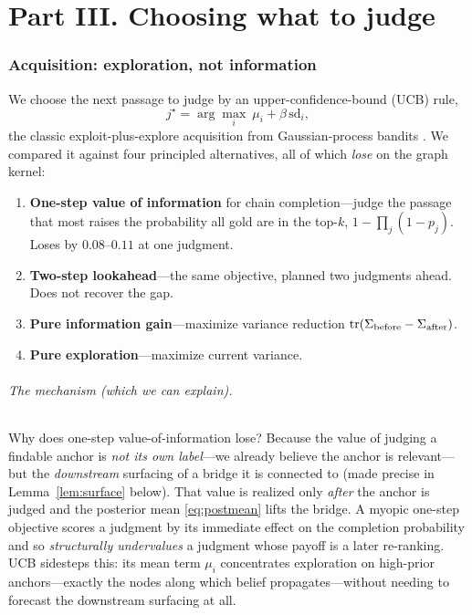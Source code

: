 \documentclass[11pt]{article}
\theoremstyle{plain}
\theoremstyle{definition}
\theoremstyle{remark}
\begin{document}
\part*{Part III. Choosing what to judge}

\section{Acquisition: exploration, not information}\label{sec:acq}
We choose the next passage to judge by an upper-confidence-bound (UCB) rule,
\begin{equation}
j^\star=\arg\max_i\ \mu_i+\beta\,\mathrm{sd}_i,
\label{eq:ucb}
\end{equation}
the classic exploit-plus-explore acquisition from Gaussian-process bandits \citep{srinivas2010gpucb}. We compared it
against four principled alternatives, all of which \emph{lose} on the graph kernel:
\begin{enumerate}[topsep=2pt,itemsep=1pt,leftmargin=*]
\item \textbf{One-step value of information} for chain completion---judge the passage that most raises the
probability all gold are in the top-$k$, $1-\prod_j(1-p_j)$. Loses by $0.08$--$0.11$ at one judgment.
\item \textbf{Two-step lookahead}---the same objective, planned two judgments ahead. Does not recover the gap.
\item \textbf{Pure information gain}---maximize variance reduction $\mathrm{tr}(\Sigma_{\text{before}}-\Sigma_{\text{after}})$.
\item \textbf{Pure exploration}---maximize current variance.
\end{enumerate}

\paragraph{The mechanism (which we can explain).} Why does one-step value-of-information lose? Because the value of
judging a findable anchor is \emph{not its own label}---we already believe the anchor is relevant---but the
\emph{downstream} surfacing of a bridge it is connected to (made precise in Lemma~\ref{lem:surface} below). That
value is realized only \emph{after} the anchor is judged and the posterior mean \eqref{eq:postmean} lifts the
bridge. A myopic one-step objective scores a judgment by its immediate effect on the completion probability and so
\emph{structurally undervalues} a judgment whose payoff is a later re-ranking. UCB sidesteps this: its mean term
$\mu_i$ concentrates exploration on high-prior anchors---exactly the nodes along which belief propagates---without
needing to forecast the downstream surfacing at all.
\end{document}
